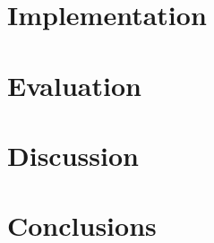 \documentclass[11pt,openright,twoside,a4paper]{report}
\begin{document}
\chapter{Implementation}
\label{ch:chapter5}








\chapter{Evaluation}
\label{ch:chapter6}


\chapter{Discussion}
\label{ch:chapter7}


\chapter{Conclusions}
\label{ch:chapter8}




\let\cleardoublepage\clearpage %
\appendix
\end{document}
